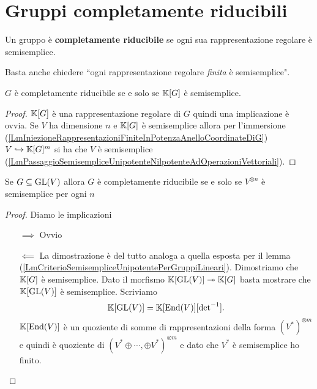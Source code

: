 \section{Gruppi completamente riducibili}
\begin{definition}
Un gruppo \`e \textbf{completamente riducibile} se ogni sua rappresentazione regolare \`e semisemplice.
\end{definition}
\begin{remark}
Basta anche chiedere ``ogni rappresentazione regolare \emph{finita} \`e semisemplice".
\end{remark}

\begin{proposition}
$G$ \`e completamente riducibile se e solo se $\mathbb{K}[G]$ \`e semisemplice.
\end{proposition}
\begin{proof}
$\mathbb{K}[G]$ \`e una rappresentazione regolare di $G$ quindi una implicazione \`e ovvia.
Se $V$ ha dimensione $n$ e $\mathbb{K}[G]$ \`e semisemplice allora per l'immersione (\ref{LmIniezioneRappresentazioniFiniteInPotenzaAnelloCoordinateDiG}) $V\hookrightarrow \mathbb{K}[G]^m$ si ha che $V$ \`e semisemplice (\ref{LmPassaggioSemisempliceUnipotenteNilpotenteAdOperazioniVettoriali}).
\end{proof}


\begin{lemma}
    Se $G\subseteq \operatorname{GL}(V)$ allora $G$ \`e completamente riducibile se e solo se $V^{\otimes n}$ \`e semisemplice per ogni $n$
\end{lemma}
\begin{proof}
Diamo le implicazioni
\setlength{\leftmargini}{0cm}
\begin{itemize}
\item[$\boxed{\implies}$] Ovvio
\item[$\boxed{\impliedby}$] La dimostrazione \`e del tutto analoga a quella esposta per il lemma (\ref{LmCriterioSemisempliceUnipotentePerGruppiLineari}). Dimostriamo che $\mathbb{K}[G]$ \`e semisemplice. Dato il morfismo
$\mathbb{K}[\operatorname{GL}(V)]\twoheadrightarrow \mathbb{K}[G]$
basta mostrare che $\mathbb{K}[\operatorname{GL}(V)]$ \`e semisemplice. Scriviamo \[\mathbb{K}[\operatorname{GL}(V)]=\mathbb{K}[\operatorname{End}(V)][{\det}^{-1}].\]
$\mathbb{K}[\operatorname{End}(V)]$ \`e un quoziente di somme di rappresentazioni della forma $(V^\ast)^{\otimes m}$ e quindi \`e quoziente di $(V^\ast\oplus\cdots, \oplus V^\ast)^{\otimes m}$ e dato che $V^\ast$ \`e semisemplice ho finito.
\end{itemize}
\setlength{\leftmargini}{0.5cm}
\end{proof}

